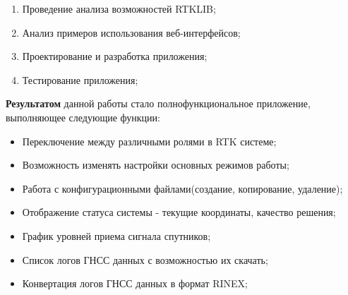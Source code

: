 \begin{enumerate}
  \item Проведение анализа возможностей RTKLIB;
  \item Анализ примеров использования веб-интерфейсов;
  \item Проектирование и разработка приложения;
  \item Тестирование приложения;
\end{enumerate}

\textbf{Результатом} данной работы стало полнофункциональное приложение, выполняющее следующие функции:

\begin{itemize}
  \item Переключение между различными ролями в RTK системе;
  \item Возможность изменять настройки основных режимов работы;
  \item Работа с конфигурационными файлами(создание, копирование, удаление);
  \item Отображение статуса системы - текущие координаты, качество решения;
  \item График уровней приема сигнала спутников;
  \item Список логов ГНСС данных с возможностью их скачать;
  \item Конвертация логов ГНСС данных в формат RINEX;
\end{itemize}

